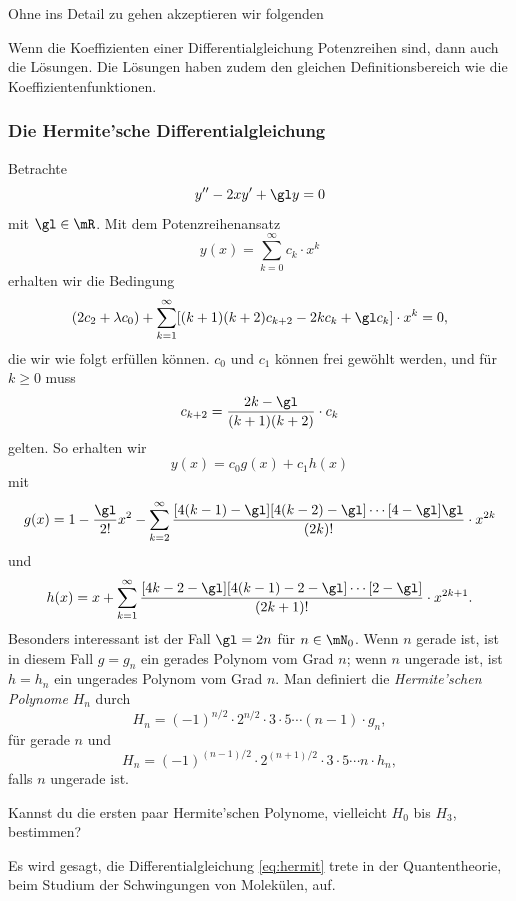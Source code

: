 \documentclass[%
draft,
11pt,%
twoside,%
titlepage,%
german,%
headsepline%
]{scrartcl}
\begin{document}
Ohne ins Detail zu gehen akzeptieren wir folgenden
\begin{satz}
Wenn
die Koeffizienten einer Differentialgleichung Potenzreihen sind, dann auch die L\"osungen. Die L\"osungen haben zudem den gleichen Definitionsbereich wie die Koeffizientenfunktionen.
\end{satz}

\subsubsection{Die Hermite'sche Differentialgleichung}

Betrachte
\begin{equation}\label{eq:hermit}
y''-2xy'+\gl y=0
\end{equation}
mit $\gl\in\mR$. Mit dem Potenzreihenansatz
$$y(x)=\sum_{k=0}^\infty c_k\cdot x^k$$
erhalten wir die Bedingung
$$
(2c_2+\lambda c_0)
+\sum_{k=1}^\infty[(k+1)(k+2)c_{k+2}-2kc_k+\gl c_k]\cdot x^k=0,
$$
die wir wie folgt erf\"ullen k\"onnen. $c_0$ und $c_1$ k\"onnen frei gew\"ohlt werden, und f\"ur $k\geq0$ muss
$$c_{k+2}=\frac{2k-\gl}{(k+1)(k+2)}\cdot c_k$$
gelten. So erhalten wir
$$y(x)=c_0g(x)+c_1h(x)$$
mit
$$
g(x)=1-\frac{\gl}{2!}x^2
-\sum_{k=2}^\infty\frac{[4(k-1)-\gl][4(k-2)-\gl]\dotsm[4-\gl]\gl}{(2k)!}\cdot x^{2k}
$$
und
$$
h(x)=x
+\sum_{k=1}^\infty\frac{[4k-2-\gl][4(k-1)-2-\gl]\dotsm[2-\gl]}{(2k+1)!}\cdot x^{2k+1}.
$$
Besonders interessant ist der Fall $\gl=2n$ f\"ur $n\in\mN_0$. Wenn $n$ gerade ist, ist in diesem Fall $g=g_n$ ein gerades Polynom vom Grad $n$; wenn $n$ ungerade ist, ist $h=h_n$ ein ungerades Polynom vom Grad $n$. Man definiert die \emph{Hermite'schen Polynome} $H_n$ durch
$$H_n=(-1)^{n/2}\cdot2^{n/2}\cdot3\cdot5\dotsm(n-1)\cdot g_n,$$
f\"ur gerade $n$ und
$$H_n=(-1)^{(n-1)/2}\cdot2^{(n+1)/2}\cdot3\cdot5\dotsm n\cdot h_n,$$
falls $n$ ungerade ist.

\begin{ueb}
Kannst du die ersten paar Hermite'schen Polynome, vielleicht $H_0$ bis $H_3$, bestimmen?
\end{ueb}

\begin{bem}
Es wird gesagt, die Differentialgleichung \eqref{eq:hermit} trete in der Quantentheorie, beim Studium der Schwingungen von Molek\"ulen, auf.
\end{bem}
\end{document}
